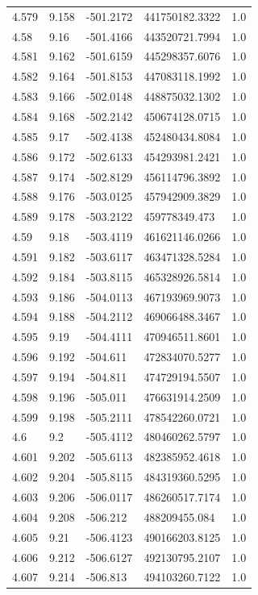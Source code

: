 \begin{tabular}{lllll}
4.579 & 9.158 & -501.2172 & 441750182.3322 & 1.0 \\
4.58 & 9.16 & -501.4166 & 443520721.7994 & 1.0 \\
4.581 & 9.162 & -501.6159 & 445298357.6076 & 1.0 \\
4.582 & 9.164 & -501.8153 & 447083118.1992 & 1.0 \\
4.583 & 9.166 & -502.0148 & 448875032.1302 & 1.0 \\
4.584 & 9.168 & -502.2142 & 450674128.0715 & 1.0 \\
4.585 & 9.17 & -502.4138 & 452480434.8084 & 1.0 \\
4.586 & 9.172 & -502.6133 & 454293981.2421 & 1.0 \\
4.587 & 9.174 & -502.8129 & 456114796.3892 & 1.0 \\
4.588 & 9.176 & -503.0125 & 457942909.3829 & 1.0 \\
4.589 & 9.178 & -503.2122 & 459778349.473 & 1.0 \\
4.59 & 9.18 & -503.4119 & 461621146.0266 & 1.0 \\
4.591 & 9.182 & -503.6117 & 463471328.5284 & 1.0 \\
4.592 & 9.184 & -503.8115 & 465328926.5814 & 1.0 \\
4.593 & 9.186 & -504.0113 & 467193969.9073 & 1.0 \\
4.594 & 9.188 & -504.2112 & 469066488.3467 & 1.0 \\
4.595 & 9.19 & -504.4111 & 470946511.8601 & 1.0 \\
4.596 & 9.192 & -504.611 & 472834070.5277 & 1.0 \\
4.597 & 9.194 & -504.811 & 474729194.5507 & 1.0 \\
4.598 & 9.196 & -505.011 & 476631914.2509 & 1.0 \\
4.599 & 9.198 & -505.2111 & 478542260.0721 & 1.0 \\
4.6 & 9.2 & -505.4112 & 480460262.5797 & 1.0 \\
4.601 & 9.202 & -505.6113 & 482385952.4618 & 1.0 \\
4.602 & 9.204 & -505.8115 & 484319360.5295 & 1.0 \\
4.603 & 9.206 & -506.0117 & 486260517.7174 & 1.0 \\
4.604 & 9.208 & -506.212 & 488209455.084 & 1.0 \\
4.605 & 9.21 & -506.4123 & 490166203.8125 & 1.0 \\
4.606 & 9.212 & -506.6127 & 492130795.2107 & 1.0 \\
4.607 & 9.214 & -506.813 & 494103260.7122 & 1.0 \\

\end{tabular}
